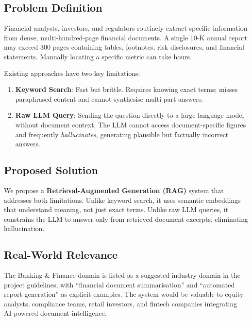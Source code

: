 \documentclass[12pt,a4paper]{article}
\begin{document}
\subsection{Problem Definition}

Financial analysts, investors, and regulators routinely extract specific information from dense, multi-hundred-page financial documents. A single 10-K annual report may exceed 300 pages containing tables, footnotes, risk disclosures, and financial statements. Manually locating a specific metric can take hours.

Existing approaches have two key limitations:

\begin{enumerate}[leftmargin=*]
  \item \textbf{Keyword Search}: Fast but brittle. Requires knowing exact terms; misses paraphrased content and cannot synthesise multi-part answers.
  \item \textbf{Raw LLM Query}: Sending the question directly to a large language model without document context. The LLM cannot access document-specific figures and frequently \textit{hallucinates}, generating plausible but factually incorrect answers.
\end{enumerate}

\subsection{Proposed Solution}

We propose a \textbf{Retrieval-Augmented Generation (RAG)} system that addresses both limitations. Unlike keyword search, it uses semantic embeddings that understand meaning, not just exact terms. Unlike raw LLM queries, it constrains the LLM to answer only from retrieved document excerpts, eliminating hallucination.

\subsection{Real-World Relevance}

The Banking \& Finance domain is listed as a suggested industry domain in the project guidelines, with ``financial document summarisation'' and ``automated report generation'' as explicit examples. The system would be valuable to equity analysts, compliance teams, retail investors, and fintech companies integrating AI-powered document intelligence.

\end{document}
